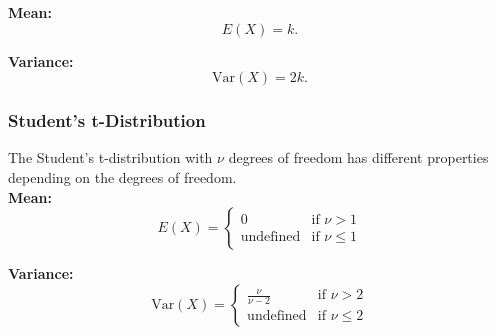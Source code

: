 \textbf{Mean:}
\[
E(X) = k.
\]

\textbf{Variance:}
\[
\text{Var}(X) = 2k.
\]

\subsubsection{Student's t-Distribution}

The Student's t-distribution with \( \nu \) degrees of freedom has different properties depending on the degrees of freedom.\\

\textbf{Mean:}
\[
E(X) = 
\begin{cases} 
0 & \text{if } \nu > 1 \\ 
\text{undefined} & \text{if } \nu \leq 1 
\end{cases}
\]

\textbf{Variance:}
\[
\text{Var}(X) = 
\begin{cases} 
\frac{\nu}{\nu - 2} & \text{if } \nu > 2 \\ 
\text{undefined} & \text{if } \nu \leq 2 
\end{cases}
\]

